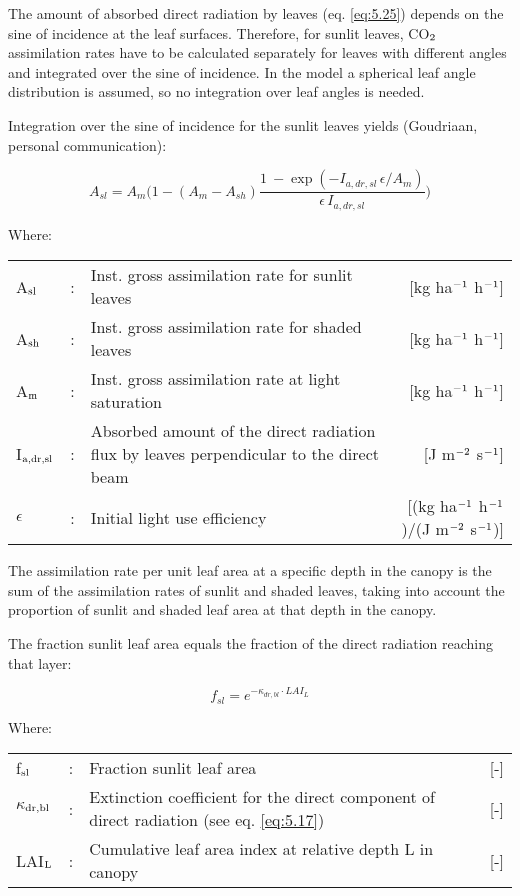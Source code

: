 The amount of absorbed direct radiation by leaves (eq. \ref{eq:5.25}) depends on the sine of
incidence at the leaf surfaces. Therefore, for sunlit leaves, CO$_{{\rm 2}}$ assimilation rates have to
be calculated separately for leaves with different angles and integrated over the sine of
incidence. In the model a spherical leaf angle distribution is assumed, so no integration
over leaf angles is needed.

Integration over the sine of incidence for the sunlit leaves yields (Goudriaan, personal
communication):

\begin{equation}
A_{sl} = A_{m} \bigg( 
   1-(A_{m} - A_{sh})  {\frac{1~- \exp({{-I _{a,dr,sl} \, \epsilon}}/{A_m}) }
                             {\epsilon\, I _{a,dr,sl} }}
   \bigg)
\end{equation}

Where:\\[5pt]
\begin{tabularx}{\textwidth}{llXr}
A$_{{\rm sl}}$ &:& Inst. gross assimilation rate for sunlit leaves  &
    [kg ha$^{{\rm -1}}$ h$^{{\rm -1}}$]\\
A$_{{\rm sh}}$ &:& Inst. gross assimilation rate for shaded leaves  &
    [kg ha$^{{\rm -1}}$ h$^{{\rm -1}}$]\\
A$_{{\rm m}}$ &:& Inst. gross assimilation rate at light saturation &
    [kg ha$^{{\rm -1}}$ h$^{{\rm -1}}$]\\
I$_{{\rm a,dr,sl}}$ &:& Absorbed amount of the direct radiation flux by leaves
    perpendicular to the direct beam  &  [J m$^{{\rm -2}}$ s$^{{\rm -1}}$]\\
$\epsilon$ &:& Initial light use efficiency  &   [(kg ha$^{{\rm -1}}$ 
    h$^{{\rm -1}}$)/(J m$^{{\rm -2}}$ s$^{{\rm -1}}$)]\\
\end{tabularx}

The assimilation rate per unit leaf area at a specific depth in the canopy is the sum of the
assimilation rates of sunlit and shaded leaves, taking into account the proportion of sunlit
and shaded leaf area at that depth in the canopy. 

The fraction sunlit leaf area equals the fraction of the direct radiation reaching that layer:

\begin{equation}
f_{sl} =  e^{-\kappa_{dr,bl} \cdot LAI_{L}}
\end{equation}
 
Where:\\[5pt]
\begin{tabularx}{\textwidth}{llXr}
f$_{{\rm sl}}$ &:& Fraction sunlit leaf area   &     [-]\\
$\kappa$$_{{\rm dr,bl}}$ &:& Extinction coefficient for the direct component of
   direct radiation (see eq. \ref{eq:5.17})   &     [-]\\
LAI$_{{\rm L}}$ &:& Cumulative leaf area index at relative depth L in canopy  &      [-]
\end{tabularx}

